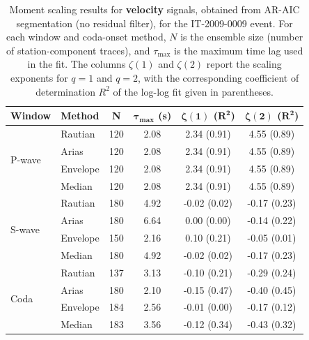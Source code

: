 \begin{table}[H]
\centering
\small
\begin{tabular}{llcccc}
\toprule
\textbf{Window} & \textbf{Method} & \textbf{N} & $\bm{\tau_{\max}}$ \textbf{(s)} & $\bm{\zeta(1)}$ \textbf{(}$\bm{R^2}$\textbf{)} & $\bm{\zeta(2)}$ \textbf{(}$\bm{R^2}$\textbf{)} \\
\midrule
\multirow{4}{*}{P-wave}
& Rautian & 120 & 2.08 & 2.34 (0.91) & 4.55 (0.89) \\
& Arias & 120 & 2.08 & 2.34 (0.91) & 4.55 (0.89) \\
& Envelope & 120 & 2.08 & 2.34 (0.91) & 4.55 (0.89) \\
& Median & 120 & 2.08 & 2.34 (0.91) & 4.55 (0.89) \\
\midrule
\multirow{4}{*}{S-wave}
& Rautian & 180 & 4.92 & -0.02 (0.02) & -0.17 (0.23) \\
& Arias & 180 & 6.64 & 0.00 (0.00) & -0.14 (0.22) \\
& Envelope & 150 & 2.16 & 0.10 (0.21) & -0.05 (0.01) \\
& Median & 180 & 4.92 & -0.02 (0.02) & -0.17 (0.23) \\
\midrule
\multirow{4}{*}{Coda}
& Rautian & 137 & 3.13 & -0.10 (0.21) & -0.29 (0.24) \\
& Arias & 180 & 2.10 & -0.15 (0.47) & -0.40 (0.45) \\
& Envelope & 184 & 2.56 & -0.01 (0.00) & -0.17 (0.12) \\
& Median & 183 & 3.56 & -0.12 (0.34) & -0.43 (0.32) \\
\bottomrule
\end{tabular}
\caption{Moment scaling results for \textbf{velocity} signals, obtained from AR-AIC segmentation (no residual filter), for the IT-2009-0009 event. For each window and coda-onset method, $N$ is the ensemble size (number of station-component traces), and $\tau_{\max}$ is the maximum time lag used in the fit. The columns $\zeta(1)$ and $\zeta(2)$ report the scaling exponents for $q=1$ and $q=2$, with the corresponding coefficient of determination $R^2$ of the log-log fit given in parentheses.}
\label{tab:ar_aic_scaling_vel_nothresh_laquila}
\end{table}